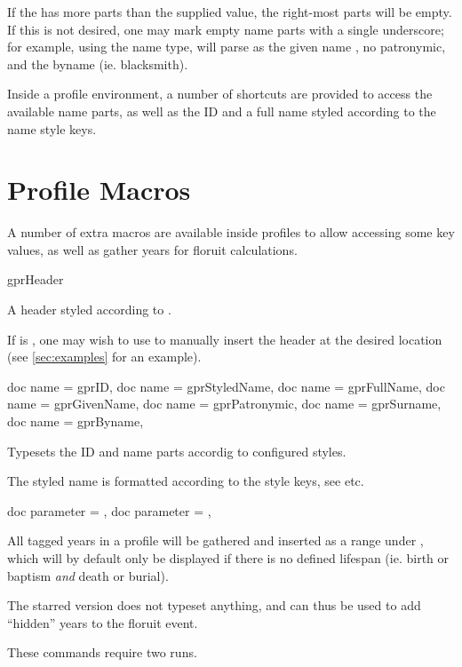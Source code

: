 \documentclass[
	a4paper,
]{article}
\begin{document}
If the  has more parts than the supplied value, the right-most parts will be empty. If this is not desired, one may mark empty name parts with a single underscore; for example, using the  name type,  will parse as the given name , no patronymic, and the byname  (ie. blacksmith).

Inside a profile environment, a number of shortcuts are provided to access the available name parts, as well as the ID and a full name styled according to the name style keys.


\section{Profile Macros} %

A number of extra macros are available inside profiles to allow accessing some key values, as well as gather years for floruit calculations.

\begin{docCommand}
	{gprHeader}
	{\brackets{}}

	A header styled according to .

	If  is , one may wish to use  to manually insert the header at the desired location (see \cref{sec:examples} for an example).

\end{docCommand}


\begin{docCommands}[
		doc parameter = {\brackets{}}
	]
	{
		{ doc name = gprID},
		{ doc name = gprStyledName},
		{ doc name = gprFullName},
		{ doc name = gprGivenName},
		{ doc name = gprPatronymic},
		{ doc name = gprSurname},
		{ doc name = gprByname},
	}

	Typesets the ID and name parts accordig to configured styles.

	The styled name is formatted according to the style keys, see  etc.
	
\end{docCommands}


\begin{docCommands}[
		doc name = {gprYear}
	]
	{
		{ doc parameter = {}},
		{ doc parameter = {\sarg{}}},
	}

	All tagged years in a profile will be gathered and inserted as a  range under , which will by default only be displayed if there is no defined lifespan (ie. birth or baptism \emph{and} death or burial).
	
	The starred version does not typeset anything, and can thus be used to add \enquote{hidden} years to the floruit event.

	These commands require two runs.
\end{docCommands}
\end{document}
